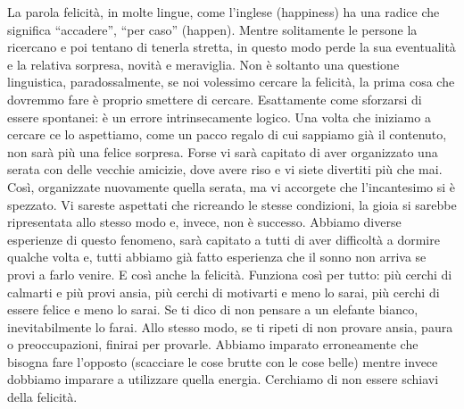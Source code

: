 \documentclass[12pt]{book} %
\begin{document}
La parola felicità, in molte lingue, come l'inglese (happiness) ha una radice che significa
“accadere”, “per caso” (happen). Mentre solitamente le persone la ricercano e poi tentano di tenerla stretta, in questo
modo perde la sua eventualità e la relativa sorpresa, novità e meraviglia. Non è soltanto una questione linguistica,
paradossalmente, se noi volessimo cercare la felicità, la prima cosa che dovremmo fare è proprio smettere di cercare.
Esattamente come sforzarsi di essere spontanei: è un errore intrinsecamente logico. Una volta che iniziamo a cercare ce
lo aspettiamo, come un pacco regalo di cui sappiamo già il contenuto, non sarà più una felice sorpresa. Forse vi sarà
capitato di aver organizzato una serata con delle vecchie amicizie, dove avere riso e vi siete divertiti più che mai.
Così, organizzate nuovamente quella serata, ma vi accorgete che l'incantesimo si è spezzato. Vi
sareste aspettati che ricreando le stesse condizioni, la gioia si sarebbe ripresentata allo stesso modo e, invece, non
è successo. Abbiamo diverse esperienze di questo fenomeno, sarà capitato a tutti di aver difficoltà a dormire qualche volta e, tutti abbiamo già fatto esperienza che il sonno non arriva se provi a farlo venire. E così anche la felicità. 
Funziona così per tutto: più cerchi di calmarti e più provi ansia, più cerchi di motivarti e meno lo sarai, più cerchi di essere felice e meno lo sarai.
Se ti dico di non pensare a un elefante bianco, inevitabilmente lo farai. Allo stesso modo, se ti ripeti di non provare ansia, paura o preoccupazioni, finirai per provarle. Abbiamo imparato erroneamente che bisogna fare l'opposto (scacciare le cose brutte con le cose belle) mentre invece dobbiamo imparare a utilizzare quella energia.
Cerchiamo di non essere schiavi della felicità.
\end{document}
